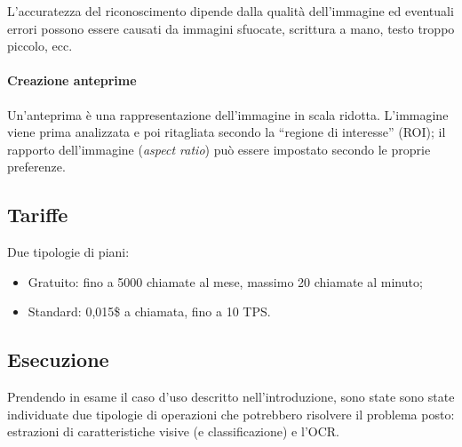 \documentclass[fleqn,a4paper,11pt]{report}
\begin{document}
L'accuratezza del riconoscimento dipende dalla qualità dell'immagine ed eventuali errori possono essere causati da immagini sfuocate, scrittura a mano, testo troppo piccolo, ecc.
   
\paragraph{Creazione anteprime} Un'anteprima è una rappresentazione dell'immagine in scala ridotta. L'immagine viene prima analizzata e poi ritagliata secondo la ``regione di interesse'' (ROI); il rapporto dell'immagine (\textit{aspect ratio}) può essere impostato secondo le proprie preferenze.


\subsection{Tariffe} Due tipologie di piani:
\begin{itemize}
\item Gratuito: fino a 5000 chiamate al mese, massimo 20 chiamate al minuto;
\item Standard: 0,015\$ a chiamata, fino a 10 TPS.
\end{itemize}


\subsection{Esecuzione}
Prendendo in esame il caso d'uso descritto nell'introduzione, sono state sono state individuate due tipologie di operazioni che potrebbero risolvere il problema posto: estrazioni di caratteristiche visive (e classificazione) e l'OCR.
\end{document}
